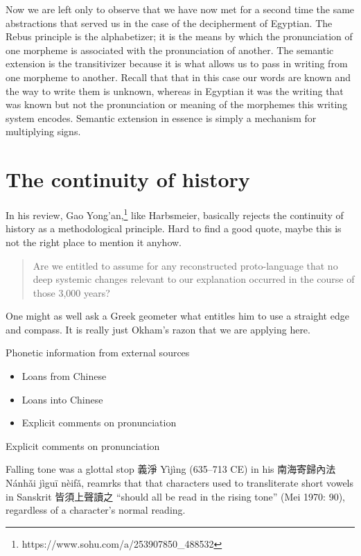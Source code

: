 Now we are left only to observe that we have now met for a second time the same abstractions that served us in the case of the decipherment of Egyptian. 
The Rebus principle is the alphabetizer; it is the means by which the pronunciation of one morpheme is associated with the pronunciation of another.  The semantic extension is the transitivizer because it is what allows us to pass in writing from one morpheme to another.  
Recall that that in this case our words are known and the way to write them is unknown, whereas in Egyptian it was the writing that was known but not the pronunciation or meaning of the morphemes this writing system encodes. Semantic extension in essence is simply a mechanism for multiplying signs. 

\section{The continuity of history}

In his review, Gao Yong'an,\footnote{https://www.sohu.com/a/253907850_488532} like Harbsmeier, basically rejects the continuity of history as a methodological principle. Hard to find a good quote, maybe this is not the right place to mention it anyhow. 

\begin{quote}
Are we entitled to assume for
any reconstructed proto-language that no deep systemic changes relevant to our
explanation occurred in the course of those 3,000 years?
\end{quote}

One might as well ask a Greek geometer what entitles him to use a straight edge and compass. It is really just Okham's razon that we are applying here. 


{Phonetic information from external sources}
\begin{itemize}
    \item Loans from Chinese 
    \item Loans into Chinese 
    \item Explicit comments on pronunciation
\end{itemize}







{Explicit comments on pronunciation}



{Falling tone was a glottal stop}
義淨 Yìjìng (635–713 CE) in his 南海寄歸內法 Nánhǎi jìguī nèifǎ, reamrks that that characters used to transliterate short vowels in Sanskrit 皆須上聲讀之 ``should all be read in the rising tone'' (Mei 1970: 90), regardless of a character's normal reading.


